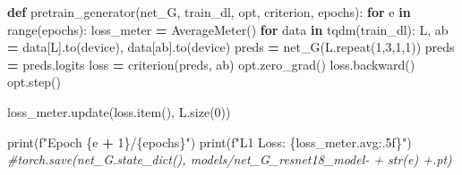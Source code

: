\documentclass[
]{article}
\newenvironment{Shaded}{\begin{snugshade}}{\end{snugshade}}
\newcommand{\BuiltInTok}[1]{#1}
\newcommand{\CommentTok}[1]{\textcolor[rgb]{0.56,0.35,0.01}{\textit{#1}}}
\newcommand{\ControlFlowTok}[1]{\textcolor[rgb]{0.13,0.29,0.53}{\textbf{#1}}}
\newcommand{\DecValTok}[1]{\textcolor[rgb]{0.00,0.00,0.81}{#1}}
\newcommand{\KeywordTok}[1]{\textcolor[rgb]{0.13,0.29,0.53}{\textbf{#1}}}
\newcommand{\NormalTok}[1]{#1}
\newcommand{\OperatorTok}[1]{\textcolor[rgb]{0.81,0.36,0.00}{\textbf{#1}}}
\newcommand{\SpecialCharTok}[1]{\textcolor[rgb]{0.00,0.00,0.00}{#1}}
\newcommand{\SpecialStringTok}[1]{\textcolor[rgb]{0.31,0.60,0.02}{#1}}
\newcommand{\StringTok}[1]{\textcolor[rgb]{0.31,0.60,0.02}{#1}}
\begin{document}
\begin{Shaded}
\begin{Highlighting}[]
\KeywordTok{def}\NormalTok{ pretrain\_generator(net\_G, train\_dl, opt, criterion, epochs):}
    \ControlFlowTok{for}\NormalTok{ e }\KeywordTok{in} \BuiltInTok{range}\NormalTok{(epochs):}
\NormalTok{        loss\_meter }\OperatorTok{=}\NormalTok{ AverageMeter()}
        \ControlFlowTok{for}\NormalTok{ data }\KeywordTok{in}\NormalTok{ tqdm(train\_dl):}
\NormalTok{            L, ab }\OperatorTok{=}\NormalTok{ data[}\StringTok{\textquotesingle{}L\textquotesingle{}}\NormalTok{].to(device), data[}\StringTok{\textquotesingle{}ab\textquotesingle{}}\NormalTok{].to(device)}
\NormalTok{            preds }\OperatorTok{=}\NormalTok{ net\_G(L.repeat(}\DecValTok{1}\NormalTok{,}\DecValTok{3}\NormalTok{,}\DecValTok{1}\NormalTok{,}\DecValTok{1}\NormalTok{))}
\NormalTok{            preds }\OperatorTok{=}\NormalTok{ preds.logits}
\NormalTok{            loss }\OperatorTok{=}\NormalTok{ criterion(preds, ab)}
\NormalTok{            opt.zero\_grad()}
\NormalTok{            loss.backward()}
\NormalTok{            opt.step()}
            
\NormalTok{            loss\_meter.update(loss.item(), L.size(}\DecValTok{0}\NormalTok{))}
            
        \BuiltInTok{print}\NormalTok{(}\SpecialStringTok{f"Epoch }\SpecialCharTok{\{}\NormalTok{e }\OperatorTok{+} \DecValTok{1}\SpecialCharTok{\}}\SpecialStringTok{/}\SpecialCharTok{\{}\NormalTok{epochs}\SpecialCharTok{\}}\SpecialStringTok{"}\NormalTok{)}
        \BuiltInTok{print}\NormalTok{(}\SpecialStringTok{f"L1 Loss: }\SpecialCharTok{\{}\NormalTok{loss\_meter}\SpecialCharTok{.}\NormalTok{avg}\SpecialCharTok{:.5f\}}\SpecialStringTok{"}\NormalTok{)}
        \CommentTok{\#torch.save(net\_G.state\_dict(), \textquotesingle{}models/net\_G\_resnet18\_model{-}\textquotesingle{} + str(e) +\textquotesingle{}.pt\textquotesingle{})}
\end{Highlighting}
\end{Shaded}
\end{document}
